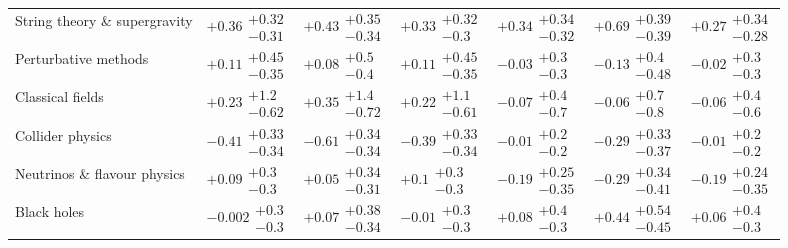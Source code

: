 \begin{table}[H]
\begin{tabular}{lllllll}
String theory \& supergravity & $\bm{+0.36}\substack{+0.32 \\ -0.31}$ & $\bm{+0.43}\substack{+0.35 \\ -0.34}$ & $\bm{+0.33}\substack{+0.32 \\ -0.3}$ & $\bm{+0.34}\substack{+0.34 \\ -0.32}$ & $\bm{+0.69}\substack{+0.39 \\ -0.39}$ & $+0.27\substack{+0.34 \\ -0.28}$ \\
Perturbative methods & $+0.11\substack{+0.45 \\ -0.35}$ & $+0.08\substack{+0.5 \\ -0.4}$ & $+0.11\substack{+0.45 \\ -0.35}$ & $-0.03\substack{+0.3 \\ -0.3}$ & $-0.13\substack{+0.4 \\ -0.48}$ & $-0.02\substack{+0.3 \\ -0.3}$ \\
Classical fields & $+0.23\substack{+1.2 \\ -0.62}$ & $+0.35\substack{+1.4 \\ -0.72}$ & $+0.22\substack{+1.1 \\ -0.61}$ & $-0.07\substack{+0.4 \\ -0.7}$ & $-0.06\substack{+0.7 \\ -0.8}$ & $-0.06\substack{+0.4 \\ -0.6}$ \\
Collider physics & $\bm{-0.41}\substack{+0.33 \\ -0.34}$ & $\bm{-0.61}\substack{+0.34 \\ -0.34}$ & $\bm{-0.39}\substack{+0.33 \\ -0.34}$ & $-0.01\substack{+0.2 \\ -0.2}$ & $-0.29\substack{+0.33 \\ -0.37}$ & $-0.01\substack{+0.2 \\ -0.2}$ \\
Neutrinos \& flavour physics & $+0.09\substack{+0.3 \\ -0.3}$ & $+0.05\substack{+0.34 \\ -0.31}$ & $+0.1\substack{+0.3 \\ -0.3}$ & $-0.19\substack{+0.25 \\ -0.35}$ & $-0.29\substack{+0.34 \\ -0.41}$ & $-0.19\substack{+0.24 \\ -0.35}$ \\
Black holes & $-0.002\substack{+0.3 \\ -0.3}$ & $+0.07\substack{+0.38 \\ -0.34}$ & $-0.01\substack{+0.3 \\ -0.3}$ & $+0.08\substack{+0.4 \\ -0.3}$ & $+0.44\substack{+0.54 \\ -0.45}$ & $+0.06\substack{+0.4 \\ -0.3}$ \\

\end{tabular}
\end{table}
